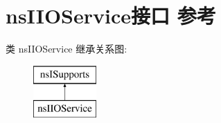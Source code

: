 \hypertarget{interfacens_i_i_o_service}{}\section{ns\+I\+I\+O\+Service接口 参考}
\label{interfacens_i_i_o_service}
类 ns\+I\+I\+O\+Service 继承关系图\+:\begin{figure}[H]
\begin{center}
\leavevmode
\includegraphics[height=2.000000cm]{interfacens_i_i_o_service}
\end{center}
\end{figure}
